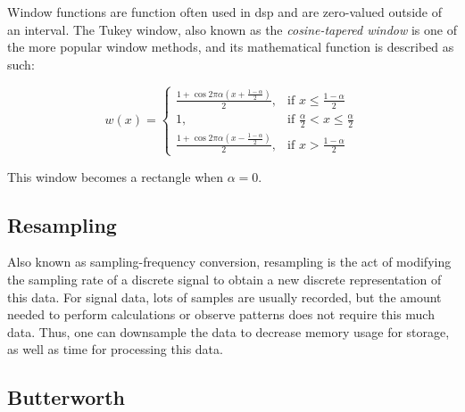 Window functions are function often used in \acrshort{dsp} and are zero-valued outside of an interval. The Tukey window, also known as the \textit{cosine-tapered window} is one of the more popular window methods, and its mathematical function is described as such: 

\[
    w(x)= 
\begin{cases}
    \frac{1 + \cos{2 \pi \alpha (x + \frac{1-\alpha}{2})}}{2}, & \text{if } x \leq \frac{1-\alpha}{2}\\
    1,              & \text{if } \frac{\alpha}{2} < x \leq \frac{\alpha}{2}\\
    \frac{1 + \cos{2 \pi \alpha (x - \frac{1-\alpha}{2})}}{2}, & \text{if } x > \frac{1-\alpha}{2}
\end{cases}
\]

This window becomes a rectangle when $\alpha = 0$.


\subsection{Resampling}

Also known as sampling-frequency conversion, resampling is the act of modifying the sampling rate of a discrete signal to obtain a new discrete representation of this data. For signal data, lots of samples are usually recorded, but the amount needed to perform calculations or observe patterns does not require this much data. Thus, one can downsample the data to decrease memory usage for storage, as well as time for processing this data. \\


\subsection{Butterworth}